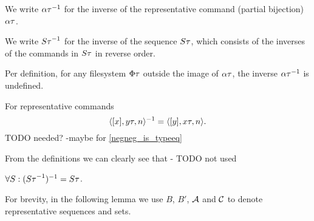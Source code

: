 
\begin{mydef}
We write $\alpha\tau^{-1}$ for
the inverse of the representative command (partial bijection) $\alpha\tau$.

We write ${S\tau}^{-1}$ for the inverse of the sequence $S\tau$, which consists of the inverses of the commands in $S\tau$
in reverse order.
\end{mydef}
Per definition, for any filesystem $\Phi\tau$ outside the image of $\alpha\tau$, the inverse $\alpha\tau^{-1}$ is undefined.

\begin{mylem}
For representative commands
\[ \langle{[x],{y}\tau,n}\rangle^{-1} = \langle{[y],{x}\tau,n}\rangle. \]
TODO needed? -maybe for \cref{negneg_is_typeeq}
\end{mylem}

From the definitions we can clearly see that - TODO not used
\begin{mycor}\label{negneg_is_typeeq}
$\forall S: ({S\tau}^{-1})^{-1} = S\tau$.
\end{mycor}

For brevity, in the following lemma we use $B$, $B'$, $\mathcal{A}$ and $\mathcal{C}$ to denote
representative sequences and sets.

\newcommand{\ia}{\sqs{A}}
\newcommand{\ic}{\sqs{C}}
\newcommand{\ibi}{B^{-1}}

